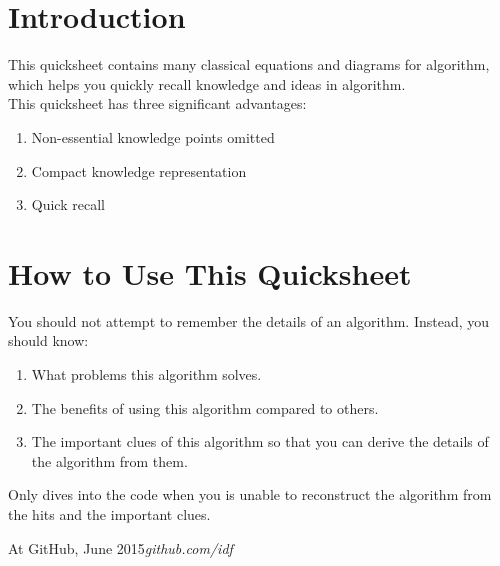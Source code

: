 %
%

\preface
\section*{Introduction}
This quicksheet contains many classical equations and diagrams for algorithm, which helps you quickly recall knowledge and ideas in algorithm.\\

This quicksheet has three significant advantages:
\begin{enumerate}
\item Non-essential knowledge points omitted
\item Compact knowledge representation
\item Quick recall
\end{enumerate}
\section*{How to Use This Quicksheet}
You should not attempt to remember the details of an algorithm. Instead, you should know:
\begin{enumerate}
\item What problems this algorithm solves.
\item The benefits of using this algorithm compared to others.
\item The important clues of this algorithm so that you can derive the details of the algorithm from them.
\end{enumerate}
Only dives into the code when you is unable to reconstruct the algorithm from the hits and the important clues. 

\vspace{\baselineskip}
\begin{flushright}\noindent
At GitHub, June 2015\hfill {\it github.com/idf} \\
\end{flushright}
